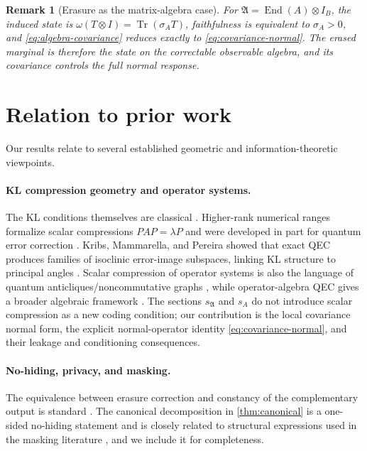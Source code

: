 \documentclass[11pt]{article}
\newtheorem{remark}[theorem]{Remark}
\theoremstyle{definition}
\newcommand{\Tr}{\operatorname{Tr}}
\newcommand{\1}{\mathbf 1}
\begin{document}
\begin{remark}[Erasure as the matrix-algebra case]
For $\mathfrak A=\operatorname{End}(A)\otimes I_B$, the induced state is
$\omega(T\otimes I)=\Tr(\sigma_A T)$, faithfulness is equivalent to $\sigma_A>0$, and \cref{eq:algebra-covariance} reduces exactly to \cref{eq:covariance-normal}.  The erased marginal is therefore the state on the correctable observable algebra, and its covariance controls the full normal response.
\end{remark}


\section{Relation to prior work}
\label{sec:related}

Our results relate to several established geometric and information-theoretic viewpoints.

\paragraph{KL compression geometry and operator systems.}
The KL conditions themselves are classical \cite{KnillLaflamme1997}.  Higher-rank numerical ranges formalize scalar compressions $PAP=\lambda P$ and were developed in part for quantum error correction \cite{ChoiKribsZyczkowski2005}.  Kribs, Mammarella, and Pereira showed that exact QEC produces families of isoclinic error-image subspaces, linking KL structure to principal angles \cite{KribsMammarellaPereira2019}.  Scalar compression of operator systems is also the language of quantum anticliques/noncommutative graphs \cite{Weaver2018}, while operator-algebra QEC gives a broader algebraic framework \cite{KribsEtAl2005}.  The sections $s_{\mathfrak A}$ and $s_A$ do not introduce scalar compression as a new coding condition; our contribution is the local covariance normal form, the explicit normal-operator identity \eqref{eq:covariance-normal}, and their leakage and conditioning consequences.

\paragraph{No-hiding, privacy, and masking.}
The equivalence between erasure correction and constancy of the complementary output is standard \cite{KretschmannKribsSpekkens2007,BenyOreshkov2009}.  The canonical decomposition in \cref{thm:canonical} is a one-sided no-hiding statement and is closely related to structural expressions used in the masking literature \cite{BraunsteinPati2006,HanEtAl2020}, and we include it for completeness.
\end{document}
